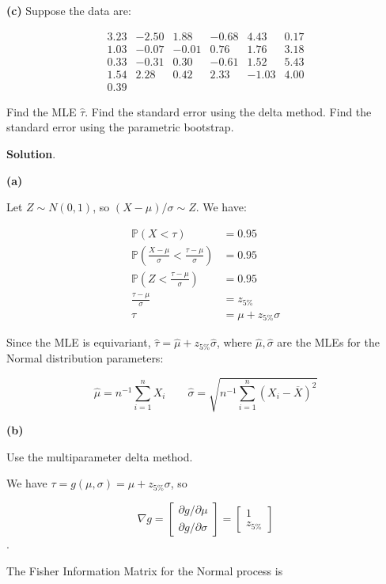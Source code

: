 \textbf{(c)} Suppose the data are:

\[
\begin{matrix}
3.23 & -2.50 &  1.88 & -0.68 &  4.43 & 0.17 \\ 
1.03 & -0.07 & -0.01 &  0.76 &  1.76 & 3.18 \\
0.33 & -0.31 &  0.30 & -0.61 &  1.52 & 5.43 \\
1.54 &  2.28 &  0.42 &  2.33 & -1.03 & 4.00 \\
0.39 
\end{matrix}
\]

Find the MLE \(\hat{\tau}\). Find the standard error using the delta method. Find the standard error using the parametric bootstrap.

\textbf{Solution}.

\textbf{(a)}

Let \(Z \sim N(0, 1)\), so \((X - \mu) / \sigma \sim Z\). We have:

\begin{align*}
\mathbb{P}(X < \tau) &= 0.95 \\
\mathbb{P}\left(\frac{X - \mu}{\sigma} < \frac{\tau - \mu}{\sigma}\right) &= 0.95 \\
\mathbb{P}\left(Z < \frac{\tau - \mu}{\sigma}\right) &= 0.95 \\
\frac{\tau - \mu}{\sigma} &= z_{5\%} \\
\tau &= \mu + z_{5\%} \sigma 
\end{align*}

Since the MLE is equivariant,
\(\hat{\tau} = \hat{\mu} + z_{5\%} \hat{\sigma}\), where
\(\hat{\mu}, \hat{\sigma}\) are the MLEs for the Normal distribution
parameters:

\[ \hat{\mu} = n^{-1} \sum_{i=1}^{n} X_{i}
\quad \quad
\hat{\sigma} = \sqrt{n^{-1} \sum_{i=1}^{n} (X_{i} - \overline{X})^{2}}
\]

\textbf{(b)}

Use the multiparameter delta method.

We have \(\tau = g(\mu, \sigma) = \mu + z_{5\%} \sigma\), so

\[ \nabla g = \begin{bmatrix}
\partial g / \partial \mu \\
\partial g / \partial \sigma
\end{bmatrix}
= \begin{bmatrix}
1 \\
z_{5\%}
\end{bmatrix}\].

The Fisher Information Matrix for the Normal process is

